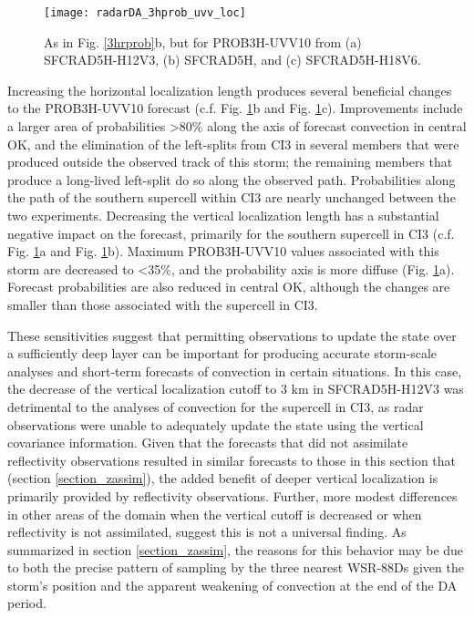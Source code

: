 \begin{figure}
\centering
\texttt{[image: radarDA\_3hprob\_uvv\_loc]}
\caption{As in Fig. \ref{3hrprob}b, but for PROB3H-UVV10 from (a) SFCRAD5H-H12V3, (b) SFCRAD5H, and (c) SFCRAD5H-H18V6.}
\label{probuvvloc}
\end{figure}

Increasing the horizontal localization length produces several beneficial changes to the PROB3H-UVV10 forecast (c.f. Fig. \ref{probuvvloc}b and Fig. \ref{probuvvloc}c). Improvements include a larger area of probabilities \textgreater 80\% along the axis of forecast convection in central OK, and the elimination of the left-splits from CI3 in several members that were produced outside the observed track of this storm; the remaining members that produce a long-lived left-split do so along the observed path. Probabilities along the path of the southern supercell within CI3 are nearly unchanged between the two experiments. Decreasing the vertical localization length has a substantial negative impact on the forecast, primarily for the southern supercell in CI3 (c.f. Fig. \ref{probuvvloc}a and Fig. \ref{probuvvloc}b). Maximum PROB3H-UVV10 values associated with this storm are decreased to \textless 35\%, and the probability axis is more diffuse (Fig. \ref{probuvvloc}a). Forecast probabilities are also reduced in central OK, although the changes are smaller than those associated with the supercell in CI3.

These sensitivities suggest that permitting observations to update the state over a sufficiently deep layer can be important for producing accurate storm-scale analyses and short-term forecasts of convection in certain situations. In this case, the decrease of the vertical localization cutoff to 3 km in SFCRAD5H-H12V3 was detrimental to the analyses of convection for the supercell in CI3, as radar observations were unable to adequately update the state using the vertical covariance information. Given that the forecasts that did not assimilate reflectivity observations resulted in similar  forecasts to those in this section that (section \ref{section_zassim}), the added benefit of deeper vertical localization is primarily provided by reflectivity observations. Further, more modest differences in other areas of the domain when the vertical cutoff is decreased or when reflectivity is not assimilated, suggest this is not a universal finding. As summarized in section \ref{section_zassim}, the reasons for this behavior may be due to both the precise pattern of sampling by the three nearest WSR-88Ds given the storm's position and the apparent weakening of convection at the end of the DA period. 

